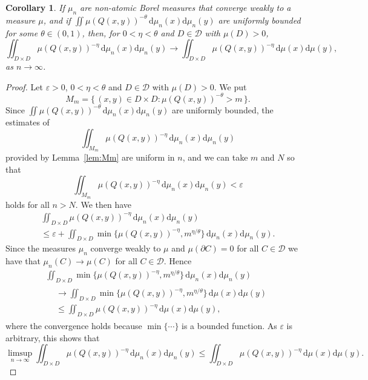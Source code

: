 \documentclass[11pt]{article}
\newtheorem{coro}[theo]{Corollary}
\theoremstyle{definition}
\numberwithin{equation}{section}
\numberwithin{figure}{section}
\numberwithin{table}{section}
\newcommand*{\dd}{\mathrm{d}}
\begin{document}
\begin{coro}\label{cor:energyconvergence}
If $\mu_n$ are non-atomic Borel measures that converge weakly to a measure $\mu$, and if $\iint \mu (Q(x,y))^{-\theta} \, \dd
\mu_n (x) \dd \mu_n (y)$ are uniformly bounded for some $\theta \in (0,1)$, then, for $0 < \eta < \theta$ and $D \in
\mathscr{D}$ with $\mu (D) > 0$,
\[
\iint_{D \times D} \mu (Q(x,y))^{-\eta} \, \dd \mu_n (x)
\dd \mu_n (y) \to \iint_{D \times D} \mu (Q(x,y))^{-\eta} \,
\dd \mu (x) \dd \mu (y),
\]
as $n \to \infty$.
\end{coro}

\begin{proof}
Let $\varepsilon > 0$, $0 < \eta < \theta$ and $D \in
\mathscr{D}$ with $\mu (D) > 0$. We put
\[
M_m = \{\, (x,y) \in D \times D: \mu (Q(x,y))^{-\theta} > m \,\}.
\]
Since $\iint \mu (Q(x,y))^{-\theta} \, \dd \mu_n (x)
\dd \mu_n (y)$ are uniformly bounded, the estimates of
\[
\iint_{M_m} \mu (Q (x,y))^{-\eta} \, \dd \mu_n (x) \dd
\mu_n (y)
\]
provided by Lemma~\ref{lem:Mm} are uniform in $n$, and we can take $m$ and $N$ so that
\[
\iint_{M_m} \mu (Q (x,y))^{-\eta} \, \dd \mu_n (x) \dd
\mu_n (y) < \varepsilon
\]
holds for all $n > N$. We then have
\begin{multline*}
\iint_{D \times D} \mu (Q (x,y))^{-\eta} \, \dd\mu_n (x)
\dd\mu_n (y) \\ \leq \varepsilon + \iint_{D \times D} \min \{
\mu(Q (x,y))^{-\eta}, m^{\eta/\theta} \} \, \dd\mu_n (x)
\dd \mu_n (y).
\end{multline*}
Since the measures $\mu_n$ converge weakly to $\mu$ and $\mu (\partial C) = 0$ for all $C \in \mathscr{D}$ we have that $\mu_n (C) \to \mu (C)$ for all $C \in \mathscr{D}$. Hence
\begin{multline*}
\iint_{D \times D} \min \{ \mu(Q (x,y))^{-\eta}, m^{\eta/\theta} \} \,
\dd\mu_n (x) \dd \mu_n (y) \\
\begin{aligned}
&\to \iint_{D \times D} \min \{
\mu(Q (x,y))^{-\eta}, m^{\eta/\theta} \} \, \dd\mu (x) \dd \mu (y)\\
&\leq \iint_{D \times D} \mu(Q (x,y))^{-\eta} \, \dd \mu (x)
\dd \mu (y),
\end{aligned}
\end{multline*}
where the convergence holds because $\min \{ \cdots \}$ is a bounded function. As $\varepsilon$ is arbitrary, this shows that
\[
\limsup_{n\to \infty} \iint_{D \times D} \mu (Q (x,y))^{-\eta} \,
\dd \mu_n (x) \dd \mu_n (y) \leq \iint_{D \times D} \mu(Q (x,y))^{-\eta} \, \dd\mu (x) \dd \mu (y).
\]


\end{proof}
\end{document}
